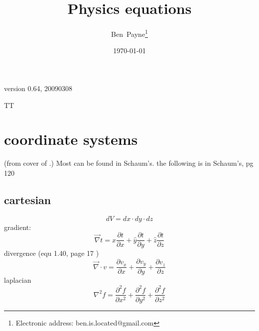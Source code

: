 \documentclass[12pt]{article}  %
\newcommand{\pfrac}[2]{\frac{\partial #1}{\partial #2}}
\def\includeSchaums{T}
\begin{document}


\title{Physics equations}
\author{Ben~Payne\footnote{Electronic address: ben.is.located@gmail.com}}
\date{\today}

\thispagestyle{empty}  %
\pagestyle{empty} %

version 0.64, 20090308

\if\includeSchaums T
\section{coordinate systems}
(from cover of \cite{GriffithED}.) Most can be found in Schaum's.
 the following is in Schaum's, pg 120
\subsection{cartesian}
\begin{equation}
dV = 	dx\cdot dy\cdot dz
\label{eq:cartesian_dV}
\end{equation}
gradient: 
\begin{equation}
\vec{\nabla} t = \widehat{x} \pfrac{t}{x}  + \widehat{y} \pfrac{t}{y} + \widehat{z} \pfrac{t}{z}  %
\label{eq:cartesian_gradient}
\end{equation}
divergence (equ 1.40, page 17 \cite{GriffithED})
\begin{equation}
 \vec{\nabla} \cdot v = \pfrac{v_x}{x} + \pfrac{v_y}{y} + \pfrac{v_z}{z}
\label{eq:cartesian_divergence}
\end{equation}
laplacian
\begin{equation}
\nabla^2 f = \pfrac{^2 f}{x^2} + \pfrac{^2 f}{y^2} + \pfrac{^2 f}{z^2}
\label{eq:cartesian_laplacian}
\end{equation}
\end{document}
